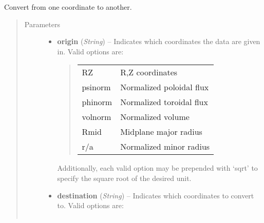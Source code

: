 \documentclass[letterpaper,10pt,english]{sphinxmanual}
\begin{document}
\begin{fulllineitems}
\begin{fulllineitems}
\begin{quote}
\begin{description}
\end{description}\end{quote}

\end{fulllineitems}


\begin{fulllineitems}
\label{eqtools:eqtools.core.Equilibrium.rho2rho}
Convert from one coordinate to another.
\begin{quote}\begin{description}
\item[{Parameters}] \leavevmode\begin{itemize}
\item {} 
\textbf{origin} (\emph{String}) --
Indicates which coordinates the data are given in.
Valid options are:
\begin{quote}

\begin{tabulary}{\linewidth}{|L|L|}
\hline

RZ
 & 
R,Z coordinates
\\

psinorm
 & 
Normalized poloidal flux
\\

phinorm
 & 
Normalized toroidal flux
\\

volnorm
 & 
Normalized volume
\\

Rmid
 & 
Midplane major radius
\\

r/a
 & 
Normalized minor radius
\\
\hline\end{tabulary}

\end{quote}

Additionally, each valid option may be prepended with `sqrt'
to specify the square root of the desired unit.

\item {} 
\textbf{destination} (\emph{String}) --
Indicates which coordinates to convert to.
Valid options are:
\begin{quote}

\begin{tabulary}{\linewidth}{|L|L|}
\hline


\end{tabulary}
\end{quote}
\end{itemize}
\end{description}
\end{quote}
\end{fulllineitems}
\end{fulllineitems}
\end{document}
